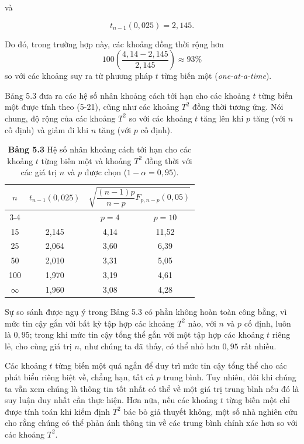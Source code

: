 và
 
\[
t_{n-1}(0{,}025)=2{,}145.
\]
 
Do đó, trong trường hợp này, các khoảng đồng thời rộng hơn
\[
100\left(\frac{4{,}14-2{,}145}{2{,}145}\right)
\approx 93\%
\]
so với các khoảng suy ra từ phương pháp $t$ từng biến một
(\emph{one-at-a-time}).
 
Bảng 5.3 đưa ra các hệ số nhân khoảng cách tới hạn cho các khoảng $t$ từng biến một được tính theo (5-21), cũng như các khoảng $T^2$ đồng thời tương ứng. Nói chung, độ rộng của các khoảng $T^2$ so với các khoảng $t$ tăng lên khi $p$ tăng (với $n$ cố định) và giảm đi khi $n$ tăng (với $p$ cố định).
 
\begin{table}[htbp]
    \centering
    \caption*{\textbf{Bảng 5.3} Hệ số nhân khoảng cách tới hạn cho các khoảng $t$ từng biến một và khoảng $T^2$ đồng thời với các giá trị $n$ và $p$ được chọn ($1-\alpha=0{,}95$).}
    \vspace{0.2cm}
 
    \begin{tabular}{c c c c}
        \toprule
        $n$
        & $t_{n-1}(0{,}025)$
        & \multicolumn{2}{c}{$
        \sqrt{\dfrac{(n-1)p}{n-p}F_{p,n-p}(0{,}05)}
        $} \\
        \cmidrule(lr){3-4}
        & & $p=4$ & $p=10$ \\
        \midrule
        15  & 2,145 & 4,14 & 11,52 \\
        25  & 2,064 & 3,60 & 6,39 \\
        50  & 2,010 & 3,31 & 5,05 \\
        100 & 1,970 & 3,19 & 4,61 \\
        $\infty$ & 1,960 & 3,08 & 4,28 \\
        \bottomrule
    \end{tabular}
\end{table}
 
Sự so sánh được ngụ ý trong Bảng 5.3 có phần không hoàn toàn công bằng, vì mức tin cậy gắn với bất kỳ tập hợp các khoảng $T^2$ nào, với $n$ và $p$ cố định, luôn là $0{,}95$; trong khi mức tin cậy tổng thể gắn với một tập hợp các khoảng $t$ riêng lẻ, cho cùng giá trị $n$, như chúng ta đã thấy, có thể nhỏ hơn $0{,}95$ rất nhiều.
 
Các khoảng $t$ từng biến một quá ngắn để duy trì mức tin cậy tổng thể cho các phát biểu riêng biệt về, chẳng hạn, tất cả $p$ trung bình. Tuy nhiên, đôi khi chúng ta vẫn xem chúng là thông tin tốt nhất có thể về một giá trị trung bình nếu đó là suy luận duy nhất cần thực hiện. Hơn nữa, nếu các khoảng $t$ từng biến một chỉ được tính toán khi kiểm định $T^2$ bác bỏ giả thuyết không, một số nhà nghiên cứu cho rằng chúng có thể phản ánh thông tin về các trung bình chính xác hơn so với các khoảng $T^2$.
 
